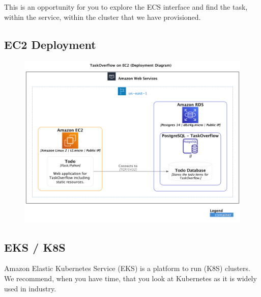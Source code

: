 \documentclass{csse4400}
\begin{document}
This is an opportunity for you to explore the ECS interface and find the task, within the service, within the cluster that we have provisioned.



\subsection{EC2 Deployment}


\begin{figure}[H]
  \includegraphics[trim=0 230 0 0,clip,width=\textwidth]{diagrams/ec2deployment}
\end{figure}

\subsection{EKS / K8S}

Amazon Elastic Kubernetes Service (EKS) is a platform to run  (K8S) clusters.
We recommend, when you have time, that you look at Kubernetes as it is widely used in industry.
\end{document}
